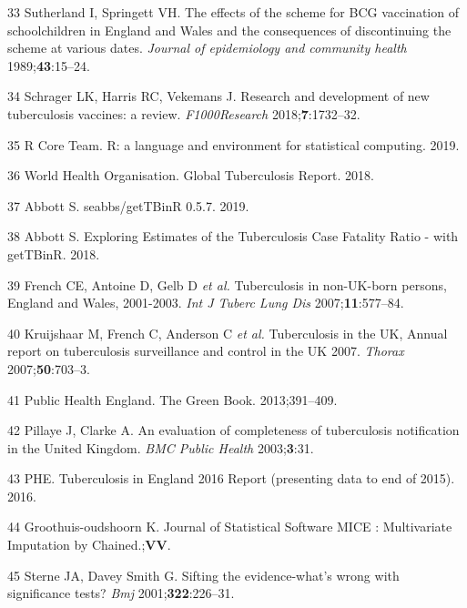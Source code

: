 \documentclass[11pt,twoside]{bristolthesis}
\begin{document}
  \leavevmode\hypertarget{ref-Sutherland1989}{}%
  33 Sutherland I, Springett VH. The effects of the scheme for BCG vaccination of schoolchildren in England and Wales and the consequences of discontinuing the scheme at various dates. \emph{Journal of epidemiology and community health} 1989;\textbf{43}:15--24.
  
  \leavevmode\hypertarget{ref-Schrager:2018ip}{}%
  34 Schrager LK, Harris RC, Vekemans J. Research and development of new tuberculosis vaccines: a review. \emph{F1000Research} 2018;\textbf{7}:1732--32.
  
  \leavevmode\hypertarget{ref-RCoreTeam2019}{}%
  35 R Core Team. R: a language and environment for statistical computing. 2019.
  
  \leavevmode\hypertarget{ref-WHO:2018}{}%
  36 World Health Organisation. Global Tuberculosis Report. 2018.
  
  \leavevmode\hypertarget{ref-Abbott:2019}{}%
  37 Abbott S. seabbs/getTBinR 0.5.7. 2019.
  
  \leavevmode\hypertarget{ref-Abbott:2018}{}%
  38 Abbott S. Exploring Estimates of the Tuberculosis Case Fatality Ratio - with getTBinR. 2018.
  
  \leavevmode\hypertarget{ref-French2007}{}%
  39 French CE, Antoine D, Gelb D \emph{et al.} Tuberculosis in non-UK-born persons, England and Wales, 2001-2003. \emph{Int J Tuberc Lung Dis} 2007;\textbf{11}:577--84.
  
  \leavevmode\hypertarget{ref-Kriujshaar2007}{}%
  40 Kruijshaar M, French C, Anderson C \emph{et al.} Tuberculosis in the UK, Annual report on tuberculosis surveillance and control in the UK 2007. \emph{Thorax} 2007;\textbf{50}:703--3.
  
  \leavevmode\hypertarget{ref-PublicHealthEngland2011a}{}%
  41 Public Health England. The Green Book. 2013;391--409.
  
  \leavevmode\hypertarget{ref-Pillaye2003}{}%
  42 Pillaye J, Clarke A. An evaluation of completeness of tuberculosis notification in the United Kingdom. \emph{BMC Public Health} 2003;\textbf{3}:31.
  
  \leavevmode\hypertarget{ref-PHE2016}{}%
  43 PHE. Tuberculosis in England 2016 Report (presenting data to end of 2015). 2016.
  
  \leavevmode\hypertarget{ref-Groothuis-oudshoorn}{}%
  44 Groothuis-oudshoorn K. Journal of Statistical Software MICE : Multivariate Imputation by Chained.;\textbf{VV}.
  
  \leavevmode\hypertarget{ref-Sterne2001}{}%
  45 Sterne JA, Davey Smith G. Sifting the evidence-what's wrong with significance tests? \emph{Bmj} 2001;\textbf{322}:226--31.
  
\end{document}
